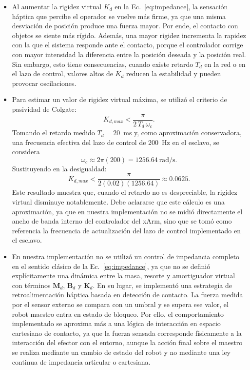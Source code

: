\documentclass[journal,10pt,twoside]{IEEEtran}
\begin{document}
\begin{itemize}
    \item Al aumentar la rigidez virtual ${K}_d$ en la Ec.~\eqref{eq:impedance}, la sensación háptica que percibe el operador se vuelve más firme, ya que una misma desviación de posición produce una fuerza mayor. Por ende, el contacto con objetos se siente más rígido. Además, una mayor rigidez incrementa la rapidez con la que el sistema responde ante el contacto, porque el controlador corrige con mayor intensidad la diferencia entre la posición deseada y la posición real. Sin embargo, esto tiene consecuencias, cuando existe retardo $T_d$ en la red o en el lazo de control, valores altos de ${K}_d$ reducen la estabilidad y pueden provocar oscilaciones. 
    \\
    
    \item Para estimar un valor de rigidez virtual máxima, se utilizó el criterio de pasividad de Colgate:
    \[
      K_{d,max}<\frac{\pi}{2\,T_d\,\omega_c}.
    \]
    Tomando el retardo medido $T_d=20$~ms y, como aproximación conservadora, una frecuencia efectiva del lazo de control de 200~Hz en el esclavo, se considera
    \[
      \omega_c \approx 2\pi(200)=1256.64\ \text{rad/s}.
    \]
    Sustituyendo en la desigualdad:
    \[
      K_{d,max}<\frac{\pi}{2(0.02)(1256.64)}\approx 0.0625.
    \]
    Este resultado muestra que, cuando el retardo no es despreciable, la rigidez virtual disminuye notablemente. Debe aclararse que este cálculo es una aproximación, ya que en nuestra implementación no se midió directamente el ancho de banda interno del controlador del xArm, sino que se tomó como referencia la frecuencia de actualización del lazo de control implementado en el esclavo.
    \\
    
    \item En nuestra implementación no se utilizó un control de impedancia completo en el sentido clásico de la Ec.~\eqref{eq:impedance}, ya que no se definió explícitamente una dinámica entre la masa, resorte y amortiguador virtual con términos $\bm{M}_d$, $\bm{B}_d$ y $\bm{K}_d$. En su lugar, se implementó una estrategia de retroalimentación háptica basada en detección de contacto. La fuerza medida por el sensor externo se compara con un umbral y se supera ese valor, el robot maestro entra en estado de bloqueo. Por ello, el comportamiento implementado se aproxima más a una lógica de interacción en espacio cartesiano de contacto, ya que la fuerza sensada corresponde físicamente a la interacción del efector con el entorno, aunque la acción final sobre el maestro se realiza mediante un cambio de estado del robot y no mediante una ley continua de impedancia articular o cartesiana.
\end{itemize}
\end{document}
